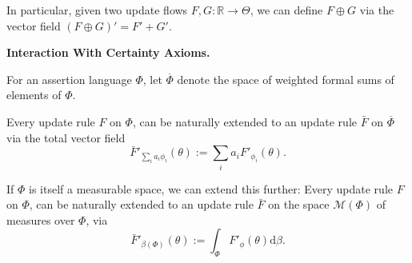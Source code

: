 \documentclass{article}
\newcommand{\ext}[1]{\overline #1} %
\begin{document}
In particular, given two update flows $F, G : \mathbb R \to \Theta$, we can define
$F \oplus G$ via the vector field $(F \oplus G)' = F' + G'$.

\begin{wip}
	\textbf{Interaction With Certainty Axioms.}

\end{wip}

\begin{defn}
	For an assertion language $\Phi$, let $\ext\Phi$ denote
	the space of weighted formal sums of elements of $\Phi$.
\end{defn}

\begin{prop}
	Every  update rule $F$ on $\Phi$, can be naturally extended to an update rule
	$\bar F$ on $\ext\Phi$
	via the total vector field
	\[
		\bar F'_{\textstyle\sum_i a_i \phi_i} ( \theta ) := \sum_{i} a_i F'_{\phi_i}(\theta).
	\]
%
\end{prop}

If $\Phi$ is itself a measurable space, we can extend this further:
Every  update rule $F$ on $\Phi$, can be naturally extended to an update rule $\bar F$ on the space $\mathcal M(\Phi)$ of measures over $\Phi$, via
\[
	\bar F'_{\beta(\Phi)}( \theta ) := \int_{\Phi} F'_\phi(\theta) \mathrm d\beta.
\]



%
%
\end{document}
